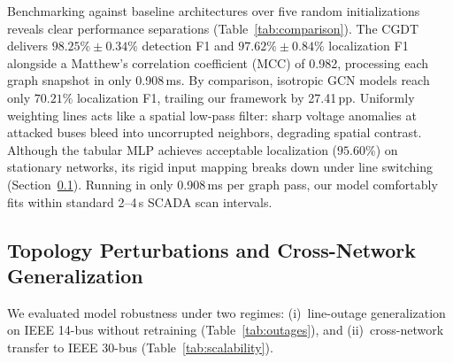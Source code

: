 \documentclass[runningheads]{llncs}
\begin{document}
Benchmarking against baseline architectures over five random initializations reveals clear performance separations (Table~\ref{tab:comparison}).
The CGDT delivers $98.25\% \pm 0.34\%$ detection F1 and $97.62\% \pm 0.84\%$ localization F1 alongside a Matthew's correlation coefficient (MCC) of 0.982, processing each graph snapshot in only 0.908\,ms.
By comparison, isotropic GCN models reach only $70.21\%$ localization F1, trailing our framework by 27.41\,pp.
Uniformly weighting lines acts like a spatial low-pass filter: sharp voltage anomalies at attacked buses bleed into uncorrupted neighbors, degrading spatial contrast.
Although the tabular MLP achieves acceptable localization ($95.60\%$) on stationary networks, its rigid input mapping breaks down under line switching (Section~\ref{sec:outages}).
Running in only 0.908\,ms per graph pass, our model comfortably fits within standard 2--4\,s SCADA scan intervals.

\subsection{Topology Perturbations and Cross-Network Generalization}
\label{sec:outages}

We evaluated model robustness under two regimes: (i)~line-outage generalization on IEEE 14-bus without retraining (Table~\ref{tab:outages}), and (ii)~cross-network transfer to IEEE 30-bus (Table~\ref{tab:scalability}).

\begin{table}[t]
\begin{minipage}[t]{0.50\textwidth}
\caption{Outage generalization (IEEE 14).}
\label{tab:outages}
\centering
{}
\end{minipage}\hfill
\begin{minipage}[t]{0.46\textwidth}
\caption{Transfer to IEEE 30-bus.}
\label{tab:scalability}
\centering
{}
\end{minipage}
\end{table}
\end{document}
